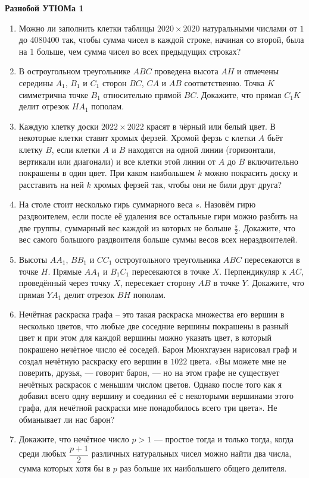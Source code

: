\documentclass{article}
\begin{document}
\large
	
\begin{center}
	\textbf{Разнобой УТЮМа 1}
\end{center}


\begin{enumerate}[label*=\protect\fbox{\arabic{enumi}}]
	
\item Можно ли заполнить клетки таблицы $2020 \times 2020$ натуральными числами от $1$ до $4 080 400$ так, чтобы сумма чисел в каждой строке, начиная со второй, была на 1 больше, чем сумма чисел во всех предыдущих строках?

\item В остроугольном треугольнике $ABC$ проведена высота $AH$ и отмечены середины $A_1$, $B_1$ и $C_1$ сторон $BC$, $CA$ и $AB$ соответственно. Точка $K$ симметрична точке $B_1$ относительно прямой $BC$. Докажите, что прямая $C_1K$ делит отрезок $HA_1$ пополам.

\item Каждую клетку доски $2022 \times 2022$ красят в чёрный или белый цвет. В некоторые клетки ставят хромых ферзей. Хромой ферзь с клетки $A$ бьёт клетку $B$, если клетки $A$ и $B$ находятся на одной линии (горизонтали, вертикали или диагонали) и все клетки этой линии от $A$ до $B$ включительно покрашены в один цвет. При каком наибольшем $k$ можно покрасить доску и расставить на ней $k$ хромых ферзей так, чтобы они не били друг друга?

\item На столе стоит несколько гирь суммарного веса $s$. Назовём гирю раздвоителем, если после её удаления все остальные гири можно разбить на две группы, суммарный вес каждой из которых не больше $\frac{s}{2}$. Докажите, что вес самого большого раздвоителя больше суммы весов всех нераздвоителей.

\item Высоты $AA_1$, $BB_1$ и $CC_1$ остроугольного треугольника $ABC$ пересекаются в точке $H$. Прямые $AA_1$ и $B_1C_1$ пересекаются в точке $X$. Перпендикуляр к $AC$, проведённый через точку $X$, пересекает сторону $AB$ в точке $Y$. Докажите, что прямая $YA_1$ делит отрезок $BH$ пополам.

\item Нечётная раскраска графа – это такая раскраска множества его вершин в несколько цветов, что любые две соседние вершины покрашены в разный цвет и при этом для каждой вершины можно указать цвет, в который покрашено нечётное число её соседей. Барон Мюнхгаузен нарисовал граф и создал нечётную раскраску его вершин в $1022$ цвета. «Вы можете мне не поверить, друзья, — говорит барон, — но на этом графе не существует нечётных раскрасок с меньшим числом цветов. Однако после того как я добавил всего одну вершину и соединил её с некоторыми вершинами этого графа, для нечётной раскраски мне понадобилось всего три цвета». Не обманывает ли нас барон?

\item Докажите, что нечётное число $p > 1$ — простое тогда и только тогда, когда среди любых $\dfrac{p+1}{2}$ различных натуральных чисел можно найти два числа, сумма которых хотя бы в $p$ раз больше их наибольшего общего делителя.


\end{enumerate}
\end{document}
